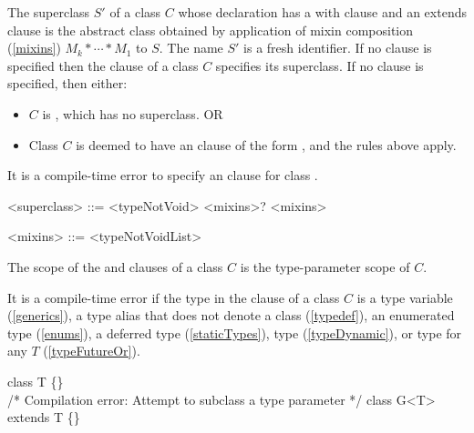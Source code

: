 \documentclass[makeidx]{article}
\begin{document}
\LMHash{}%
The superclass $S'$ of a class $C$ whose declaration has a with clause
and an extends clause
is the abstract class obtained by application of
mixin composition (\ref{mixins}) $M_k* \cdots * M_1$ to $S$.
The name $S'$ is a fresh identifier.
If no \WITH{} clause is specified then the \EXTENDS{} clause of
a class $C$ specifies its superclass.
If no \EXTENDS{} clause is specified, then either:

\begin{itemize}
\item $C$ is , which has no superclass. OR
\item Class $C$ is deemed to have an \EXTENDS{} clause of the form
  , and the rules above apply.
\end{itemize}

\LMHash{}%
It is a compile-time error to specify an \EXTENDS{} clause
for class .

\begin{grammar}
<superclass> ::= \EXTENDS{} <typeNotVoid> <mixins>?
    \alt <mixins>

<mixins> ::= \WITH{} <typeNotVoidList>
\end{grammar}

\LMHash{}%
The scope of the \EXTENDS{} and \WITH{} clauses of a class $C$ is
the type-parameter scope of $C$.

\LMHash{}%
It is a compile-time error if the type
in the \EXTENDS{} clause of a class $C$ is
a type variable (\ref{generics}),
a type alias that does not denote a class (\ref{typedef}),
an enumerated type (\ref{enums}),
a deferred type (\ref{staticTypes}), type \DYNAMIC{} (\ref{typeDynamic}),
or type  for any $T$ (\ref{typeFutureOr}).



\begin{dartCode}
class T \{\}
\\
/* Compilation error: Attempt to subclass a type parameter */
class G<T> extends T \{\}
\end{dartCode}
\end{document}
